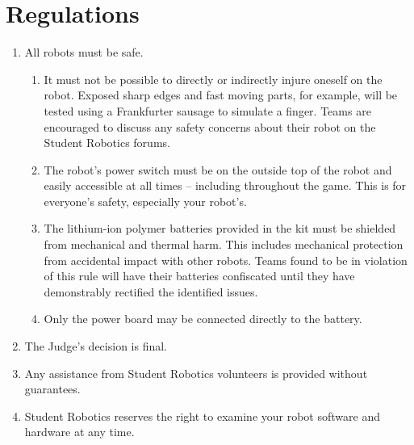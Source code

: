 \section {Regulations}
\label{sec:Regulations}

\begin{enumerate}


\item All robots must be safe.

\begin{enumerate}
  \item It must not be possible to directly or indirectly injure oneself on the robot.
        Exposed sharp edges and fast moving parts, for example, will be tested using a Frankfurter sausage to simulate a finger.
        Teams are encouraged to discuss any safety concerns about their robot on the Student Robotics forums.

  \item The robot's power switch must be on the outside top of the robot and easily accessible at all times -- including throughout the game.
        This is for everyone's safety, especially your robot's.

  \item The lithium-ion polymer batteries provided in the kit must be shielded from mechanical and thermal harm.
        This includes mechanical protection from accidental impact with other robots.
        Teams found to be in violation of this rule will have their batteries confiscated until they have demonstrably rectified the identified issues.

  \item Only the power board may be connected directly to the battery.
\end{enumerate}


\item The Judge's decision is final.
\item Any assistance from Student Robotics volunteers is provided without guarantees.
\item Student Robotics reserves the right to examine your robot software and hardware at any time.



\end{enumerate}
